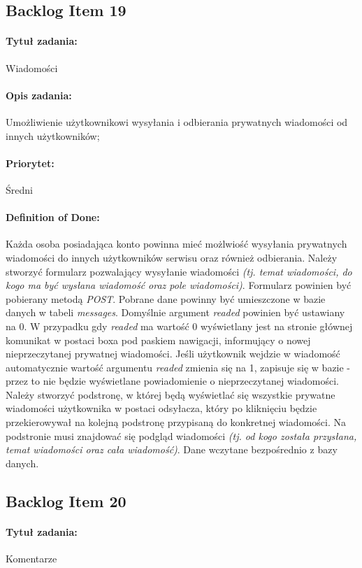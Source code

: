 \documentclass[a4paper]{article}
\begin{document}
	\subsection{Backlog Item 19}
	\paragraph{Tytuł zadania:} Wiadomości
	\paragraph{Opis zadania:} Umożliwienie użytkownikowi wysyłania i odbierania prywatnych wiadomości od innych użytkowników;
	\paragraph{Priorytet:} Średni
	\paragraph{Definition of Done:} Każda osoba posiadająca konto powinna mieć możlwiość wysyłania prywatnych wiadomości do innych użytkowników serwisu oraz również odbierania. Należy stworzyć formularz pozwalający wysyłanie wiadomości \emph{(tj. temat wiadomości, do kogo ma być wysłana wiadomość oraz pole wiadomości)}. Formularz powinien być pobierany metodą \emph{POST}. Pobrane dane powinny być umieszczone w bazie danych w tabeli \emph{messages}. Domyślnie argument \emph{readed} powinien być ustawiany na 0. W przypadku gdy \emph{readed} ma wartość 0 wyświetlany jest na stronie głównej komunikat w postaci boxa pod paskiem nawigacji, informujący o nowej nieprzeczytanej prywatnej wiadomości. Jeśli użytkownik wejdzie w wiadomość automatycznie wartość argumentu \emph{readed} zmienia się na 1, zapisuje się w bazie - przez to nie będzie wyświetlane powiadomienie o nieprzeczytanej wiadomości. Należy stworzyć podstronę, w której będą wyświetlać się wszystkie prywatne wiadomości użytkownika w postaci odsyłacza, który po kliknięciu będzie przekierowywał na kolejną podstronę przypisaną do konkretnej wiadomości. Na podstronie musi znajdować się podgląd wiadomości \emph{(tj. od kogo została przysłana, temat wiadomości oraz cała wiadomość)}. Dane wczytane bezpośrednio z bazy danych.
	
	\subsection{Backlog Item 20}
	\paragraph{Tytuł zadania:} Komentarze
\end{document}
